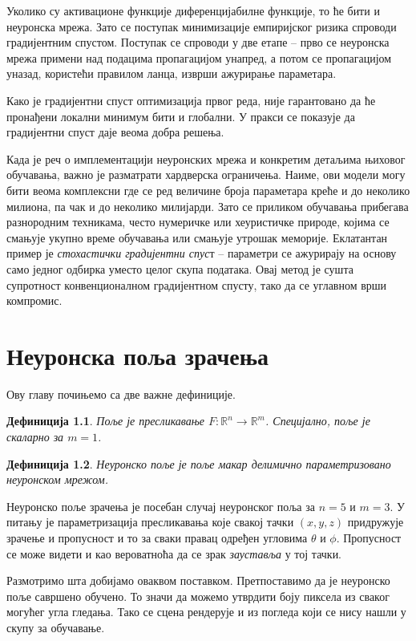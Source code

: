 \documentclass[12pt, a4paper, twoside]{book}
\numberwithin{equation}{chapter}
\numberwithin{theorem}{section}
\numberwithin{definition}{section}
\newtheorem{definitionChapter}{Дефиниција}
\numberwithin{definitionChapter}{chapter}
\begin{document}
Уколико су активационе функције диференцијабилне функције, то ће бити и неуронска мрежа. Зато се
поступак минимизације емпиријског ризика спроводи градијентним спустом. Поступак се спроводи у
две етапе -- прво се неуронска мрежа примени над подацима пропагацијом унапред, а потом се
пропагацијом уназад, користећи правилом ланца, изврши ажурирање параметара.

Како је градијентни спуст
оптимизација првог реда, није гарантовано да ће пронађени локални минимум бити и глобални. У пракси
се показује да градијентни спуст даје веома добра решења.

Када је реч о имплементацији неуронских мрежа и конкретим детаљима њиховог обучавања, важно је
разматрати хардверска ограничења. Наиме, ови модели могу бити веома комплексни где се ред величине
броја параметара креће и до неколико милиона, па чак и до неколико милијарди. Зато се приликом
обучавања прибегава разнородним техникама, често нумеричке или хеуристичке природе, којима се
смањује укупно време обучавања или смањује утрошак меморије. Еклатантан пример је \textit{стохастички
градијентни спус}т \cite{sgd} -- параметри се ажурирају на основу само једног одбирка уместо целог
скупа података. Овај метод је сушта супротност конвенционалном градијентном спусту, тако да се
углавном врши компромис.

\chapter{Неуронска поља зрачења}
Ову главу почињемо са две важне дефиниције.

	\begin{definitionChapter}
		Поље је пресликавање $F:\mathbb{R}^n \rightarrow \mathbb{R}^m$. Специјално, поље је скаларно
		за $m=1$.
	\end{definitionChapter}

	\begin{definitionChapter}
		Неуронско поље је поље макар делимично параметризовано неуронском мрежом.
	\end{definitionChapter}

	Неуронско поље зрачења је посебан случај неуронског поља за $n=5$ и $m=3$. У питању је параметризација
	пресликавања које свакој тачки $(x, y, z)$ придружује зрачење и пропусност и то за сваки правац
	одређен угловима $\theta$ и $\phi$. Пропусност се може видети и као вероватноћа да се зрак
	\textit{зауставља} у тој тачки.
	
	Размотримо шта добијамо оваквом поставком. Претпоставимо да је неуронско поље савршено обучено. То значи
	да можемо утврдити боју пиксела из сваког могућег угла гледања. Тако се сцена рендерује и из погледа
	који се нису нашли у скупу за обучавање.
\end{document}
